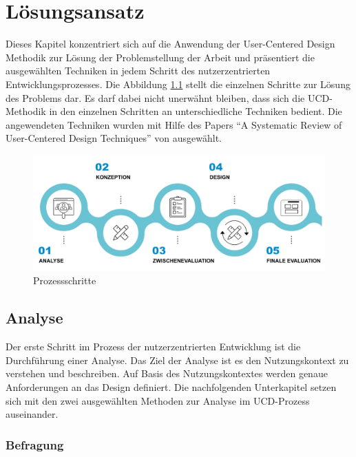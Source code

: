 \chapter{Lösungsansatz}\label{ch:approach}
Dieses Kapitel konzentriert sich auf die Anwendung der User-Centered Design Methodik zur Lösung der Problemstellung der Arbeit und präsentiert die ausgewählten Techniken in jedem Schritt des nutzerzentrierten Entwicklungsprozesses.
Die Abbildung \ref{fig:approach} stellt die einzelnen Schritte zur Lösung des Problems dar.
Es darf dabei nicht unerwähnt bleiben, dass sich die \ac{UCD}-Methodik in den einzelnen Schritten an unterschiedliche Techniken bedient.
Die angewendeten Techniken wurden mit Hilfe des Papers \enquote{A Systematic Review of User-Centered Design Techniques} von \citet{salinas_2020} ausgewählt.

\begin{figure}[h]
	\centering
    	\includegraphics[width=\textwidth]{Images/Ansatz}
   	\caption{Prozessschritte}
   	\label{fig:approach}
\end{figure}

\section{Analyse}

Der erste Schritt im Prozess der nutzerzentrierten Entwicklung ist die Durchführung einer Analyse.
Das Ziel der Analyse ist es den Nutzungskontext zu verstehen und beschreiben.
Auf Basis des Nutzungskontextes werden genaue Anforderungen an das Design definiert.
Die nachfolgenden Unterkapitel setzen sich mit den zwei ausgewählten Methoden zur Analyse im \ac{UCD}-Prozess auseinander.

\subsection{Befragung}\label{ch:interview}

